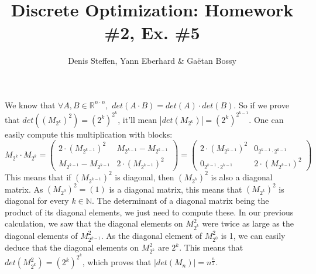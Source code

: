 \documentclass[a4paper,11pt,french]{article}
\title{Discrete Optimization: Homework \#2, Ex. \#5}
\author{Denis Steffen, Yann Eberhard \& Gaëtan Bossy}
\begin{document}
\maketitle
We know that $\forall A,B\in\mathbb{R}^{n\cdot n},\,\,det(A\cdot B)=det(A)\cdot det(B)$. So if we prove that $det((M_{2^k})^2)=(2^k)^{2^k}$, it'll mean $|det(M_{2^k})|=(2^k)^{2^{k-1}}$. One can easily compute this multiplication with blocks: 
\begin{equation*}
M_{2^k}\cdot M_{2^k}=
\begin{pmatrix}
    2\cdot(M_{2^{k-1}})^2 & M_{2^{k-1}}-M_{2^{k-1}} \\ 
    M_{2^{k-1}}-M_{2^{k-1}} &  2\cdot(M_{2^{k-1}})^2
  \end{pmatrix}=
  \begin{pmatrix}
    2\cdot(M_{2^{k-1}})^2 & 0_{2^{k-1}\cdot 2^{k-1}} \\ 
    0_{2^{k-1}\cdot 2^{k-1}} &  2\cdot(M_{2^{k-1}})^2
  \end{pmatrix}
 \end{equation*}
 This means that if $(M_{2^{k-1}})^2$ is diagonal, then $(M_{2^{k}})^2$ is also a diagonal matrix. As $(M_{2^{0}})^2=(1)$ is a diagonal matrix, this means that $(M_{2^{k}})^2$ is diagonal for every $k\in\mathbb{N}$. The determinant of a diagonal matrix being the product of its diagonal elements, we just need to compute these. In our previous calculation, we saw that the diagonal elements on $M_{2^k}^2$ were twice as large as the diagonal elements of $M_{2^{k-1}}^2$. As the diagonal element of $M_{2^0}^2$ is 1, we can easily deduce that the diagonal elements on $M_{2^k}^2$ are $2^k$. This means that $det(M_{2^k}^2)=(2^k)^{2^k}$, which proves that $|det(M_n)|=n^{\frac{n}{2}}$.
  
\end{document}
